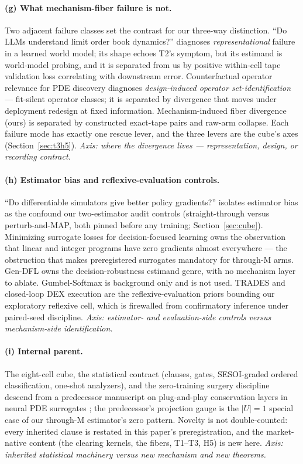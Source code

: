 \paragraph{(g) What mechanism-fiber failure is not.}
Two adjacent failure classes set the contrast for our three-way
distinction. ``Do LLMs understand limit order book dynamics?''
\citep{dolob2026} diagnoses \emph{representational} failure in a learned
world model; its shape echoes T2's symptom, but its estimand is world-model
probing, and it is separated from us by positive within-cell tape
validation loss correlating with downstream error. Counterfactual operator
relevance for PDE discovery \citep{counterfactualoperator2025} diagnoses
\emph{design-induced operator set-identification} --- fit-silent operator
classes; it is separated by divergence that moves under deployment
redesign at fixed information. Mechanism-induced fiber divergence (ours) is
separated by constructed exact-tape pairs and raw-arm collapse. Each failure
mode has exactly one rescue lever, and the three levers are the cube's axes
(Section~\ref{sec:t3h5}). \emph{Axis: where the divergence lives ---
representation, design, or recording contract.}

\paragraph{(h) Estimator bias and reflexive-evaluation controls.}
``Do differentiable simulators give better policy gradients?''
\citep{diffsimpolicy2026} isolates estimator bias as the confound our
two-estimator audit controls (straight-through versus perturb-and-MAP, both
pinned before any training; Section~\ref{sec:cube}). Minimizing surrogate
losses for decision-focused learning \citep{surrogateldfl2025} owns the
observation that linear and integer programs have zero gradients almost
everywhere --- the obstruction that makes preregistered surrogates
mandatory for through-M arms. Gen-DFL \citep{gendfl2025} owns the
decision-robustness estimand genre, with no mechanism layer to ablate.
Gumbel-Softmax \citep{gumbelsoftmax2016} is background only and is not
used. TRADES \citep{trades2025} and closed-loop DEX execution
\citep{dexclosedloop2026} are the reflexive-evaluation priors bounding our
exploratory reflexive cell, which is firewalled from confirmatory inference
under paired-seed discipline. \emph{Axis: estimator- and evaluation-side
controls versus mechanism-side identification.}

\paragraph{(i) Internal parent.}
The eight-cell cube, the statistical contract (clauses, gates, SESOI-graded
ordered classification, one-shot analyzers), and the zero-training surgery
discipline descend from a predecessor manuscript on plug-and-play
conservation layers in neural PDE surrogates \citep{paperd}; the
predecessor's projection gauge is the $\lvert U \rvert = 1$ special case of
our through-M estimator's zero pattern. Novelty is not double-counted:
every inherited clause is restated in this paper's preregistration, and the
market-native content (the clearing kernels, the fibers, T1--T3, H5) is
new here. \emph{Axis: inherited statistical machinery versus new mechanism
and new theorems.}
